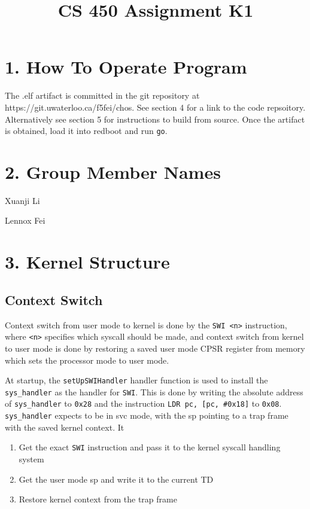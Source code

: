 \documentclass{article}
\title{CS 450 Assignment K1}
\date{}
\begin{document}
\maketitle


\section*{1. How To Operate Program}

The .elf artifact is committed in the git repository at https://git.uwaterloo.ca/f5fei/chos. See section 4 for a link to the code repsoitory. Alternatively see section 5 for instructions to build from source. Once the artifact is obtained, load it into redboot and run \texttt{go}.

\section*{2. Group Member Names}

Xuanji Li

Lennox Fei

\section*{3. Kernel Structure}

\subsection*{Context Switch}

Context switch from user mode to kernel is done by the \texttt{SWI <n>} instruction, where \texttt{<n>} specifies which syscall should be made, and context switch from kernel to user mode is done by restoring a saved user mode CPSR register from memory which sets the processor mode to user mode.

At startup, the \texttt{setUpSWIHandler} handler function is used to install the \texttt{sys\_handler} as the handler for \texttt{SWI}. This is done by writing the absolute address of \texttt{sys\_handler} to \texttt{0x28} and the instruction \texttt{LDR pc, [pc, \#0x18]} to \texttt{0x08}. \texttt{sys\_handler} expects to be in svc mode, with the sp pointing to a trap frame with the saved kernel context. It

\begin{enumerate}
\item Get the exact \texttt{SWI} instruction and pass it to the kernel syscall handling system
\item Get the user mode sp and write it to the current TD
\item Restore kernel context from the trap frame
\end{enumerate}
\end{document}
